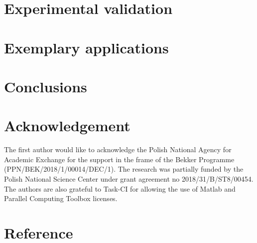 \documentclass[preprint,12pt]{elsarticle}
\begin{document}
	\section{Experimental validation}
	\section{Exemplary applications}
	\section{Conclusions}
	
	\section*{Acknowledgement}
	The first author would like to acknowledge the Polish National Agency for Academic Exchange for the support in the frame of the Bekker Programme (PPN/BEK/2018/1/00014/DEC/1). The research was partially funded by the Polish National Science Center under grant agreement no 2018/31/B/ST8/00454. The authors are also grateful to Task-CI for allowing the use of Matlab and Parallel Computing Toolbox licenses. 
	
	
	
	
	\section*{Reference}
	{}
	
\end{document}
